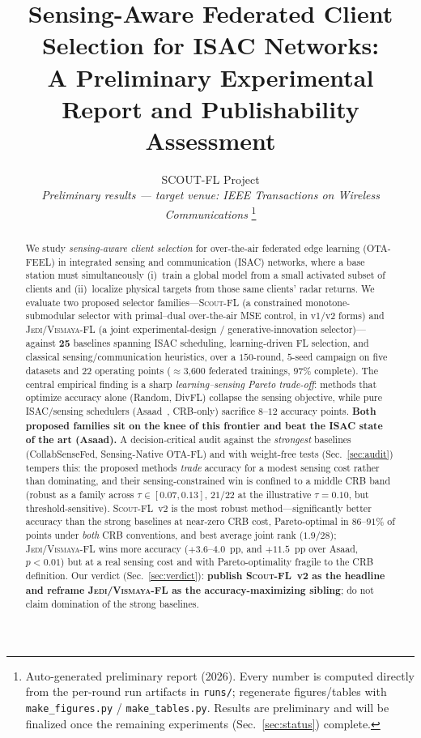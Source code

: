 \documentclass[journal,onecolumn,11pt]{IEEEtran}
\newcommand{\jedi}{\textsc{Jedi/Vismaya-FL}}
\newcommand{\scout}{\textsc{Scout-FL}}
\begin{document}
\title{Sensing-Aware Federated Client Selection for ISAC Networks:\\
A Preliminary Experimental Report and Publishability Assessment}

\author{SCOUT-FL Project\\
\textit{Preliminary results --- target venue: IEEE Transactions on Wireless Communications}
\thanks{Auto-generated preliminary report (2026). Every number is computed directly
from the per-round run artifacts in \texttt{runs/}; regenerate figures/tables with
\texttt{make\_figures.py} / \texttt{make\_tables.py}. Results are preliminary and will be
finalized once the remaining experiments (Sec.~\ref{sec:status}) complete.}}

\maketitle

\begin{abstract}
We study \emph{sensing-aware client selection} for over-the-air federated edge learning
(OTA-FEEL) in integrated sensing and communication (ISAC) networks, where a base station
must simultaneously (i)~train a global model from a small activated subset of clients and
(ii)~localize physical targets from those same clients' radar returns. We evaluate two
proposed selector families---\scout{} (a constrained monotone-submodular selector with
primal--dual over-the-air MSE control, in v1/v2 forms) and \jedi{} (a joint
experimental-design / generative-innovation selector)---against \textbf{25} baselines
spanning ISAC scheduling, learning-driven FL selection, and classical
sensing/communication heuristics, over a $150$-round, $5$-seed campaign on five datasets
and $22$ operating points ($\approx$3{,}600 federated trainings, $97\%$ complete). The
central empirical finding is a sharp \emph{learning--sensing Pareto trade-off}: methods
that optimize accuracy alone (Random, DivFL) collapse the sensing objective, while pure
ISAC/sensing schedulers (Asaad~\cite{asaad2025}, CRB-only) sacrifice $8$--$12$ accuracy
points. \textbf{Both proposed families sit on the knee of this frontier and beat the ISAC
state of the art (Asaad).} A decision-critical audit against the \emph{strongest} baselines
(CollabSenseFed, Sensing-Native OTA-FL) and with weight-free tests (Sec.~\ref{sec:audit})
tempers this: the proposed methods \emph{trade} accuracy for a modest sensing cost rather
than dominating, and their sensing-constrained win is confined to a middle CRB band
(robust as a family across $\tau\!\in\![0.07,0.13]$, $21/22$ at the illustrative
$\tau{=}0.10$, but threshold-sensitive). \scout{}~v2 is the most robust method---significantly
better accuracy than the strong baselines at near-zero CRB cost, Pareto-optimal in $86$--$91\%$
of points under \emph{both} CRB conventions, and best average joint rank ($1.9/28$); \jedi{}
wins more accuracy ($+3.6$--$4.0$~pp, and $+11.5$~pp over Asaad, $p<0.01$) but at a real
sensing cost and with Pareto-optimality fragile to the CRB definition. Our verdict
(Sec.~\ref{sec:verdict}): \textbf{publish \scout{}~v2 as the headline and reframe \jedi{} as
the accuracy-maximizing sibling}; do not claim domination of the strong baselines.
\end{abstract}
\end{document}

